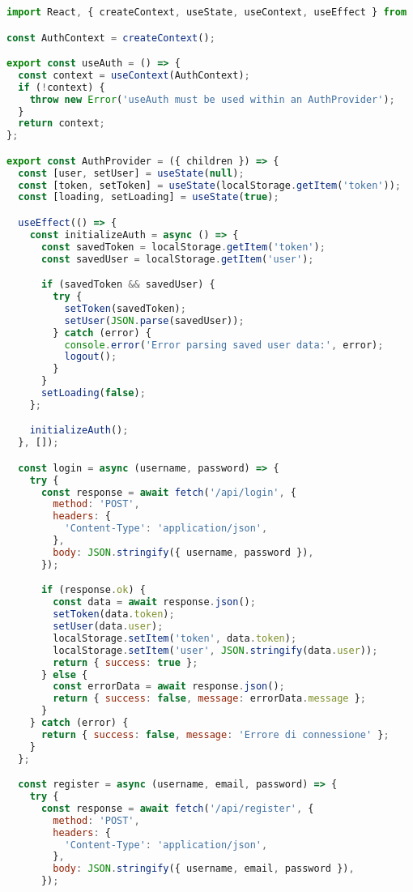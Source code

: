 \documentclass[12pt,a4paper]{report}
\begin{document}
\begin{lstlisting}[language=JavaScript, caption=AuthContext.js - Authentication Management]
import React, { createContext, useState, useContext, useEffect } from 'react';

const AuthContext = createContext();

export const useAuth = () => {
  const context = useContext(AuthContext);
  if (!context) {
    throw new Error('useAuth must be used within an AuthProvider');
  }
  return context;
};

export const AuthProvider = ({ children }) => {
  const [user, setUser] = useState(null);
  const [token, setToken] = useState(localStorage.getItem('token'));
  const [loading, setLoading] = useState(true);

  useEffect(() => {
    const initializeAuth = async () => {
      const savedToken = localStorage.getItem('token');
      const savedUser = localStorage.getItem('user');

      if (savedToken && savedUser) {
        try {
          setToken(savedToken);
          setUser(JSON.parse(savedUser));
        } catch (error) {
          console.error('Error parsing saved user data:', error);
          logout();
        }
      }
      setLoading(false);
    };

    initializeAuth();
  }, []);

  const login = async (username, password) => {
    try {
      const response = await fetch('/api/login', {
        method: 'POST',
        headers: {
          'Content-Type': 'application/json',
        },
        body: JSON.stringify({ username, password }),
      });

      if (response.ok) {
        const data = await response.json();
        setToken(data.token);
        setUser(data.user);
        localStorage.setItem('token', data.token);
        localStorage.setItem('user', JSON.stringify(data.user));
        return { success: true };
      } else {
        const errorData = await response.json();
        return { success: false, message: errorData.message };
      }
    } catch (error) {
      return { success: false, message: 'Errore di connessione' };
    }
  };

  const register = async (username, email, password) => {
    try {
      const response = await fetch('/api/register', {
        method: 'POST',
        headers: {
          'Content-Type': 'application/json',
        },
        body: JSON.stringify({ username, email, password }),
      });


\end{lstlisting}
\end{document}
